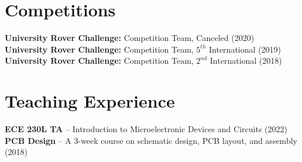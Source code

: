\documentclass[letterpaper,11pt]{article}
\begin{document}
\section{Competitions}
\begin{itemize}[leftmargin=0.15in, label={}]
	\small{\item{\textbf{University Rover Challenge:} Competition Team, Canceled (2020)\\
				 \textbf{University Rover Challenge:} Competition Team, $5^{th}$ International (2019)\\
				 \textbf{University Rover Challenge:} Competition Team, $2^{nd}$ International (2018)\\
	}}
\end{itemize}

\section{Teaching Experience}
\begin{itemize}[leftmargin=0.15in, label={}]
        \small{\item{\textbf{ECE 230L TA} -- Introduction to Microelectronic Devices and Circuits (2022)\\
        \textbf{PCB Design} -- A 3-week course on schematic design, PCB layout, and assembly (2018)
        }}
\end{itemize}

\thispagestyle{myheadings}

\end{document}
